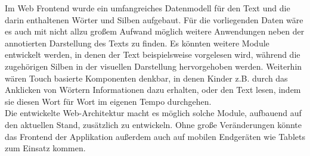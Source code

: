 Im Web Frontend wurde ein umfangreiches Datenmodell für den Text und die darin enthaltenen Wörter und Silben aufgebaut. Für die vorliegenden Daten wäre es auch mit nicht allzu großem Aufwand möglich weitere Anwendungen neben der annotierten Darstellung des Texts zu finden. Es könnten weitere Module entwickelt werden, in denen der Text beispielsweise vorgelesen wird, während die zugehörigen Silben in der visuellen Darstellung hervorgehoben werden. Weiterhin wären Touch basierte Komponenten denkbar, in denen Kinder z.B. durch das Anklicken von Wörtern Informationen dazu erhalten, oder den Text lesen, indem sie diesen Wort für Wort im eigenen Tempo durchgehen.\\
Die entwickelte Web-Architektur macht es möglich solche Module, aufbauend auf den aktuellen Stand, zusätzlich zu entwickeln. Ohne große Veränderungen könnte das Frontend der Applikation außerdem auch auf mobilen Endgeräten wie Tablets zum Einsatz kommen.